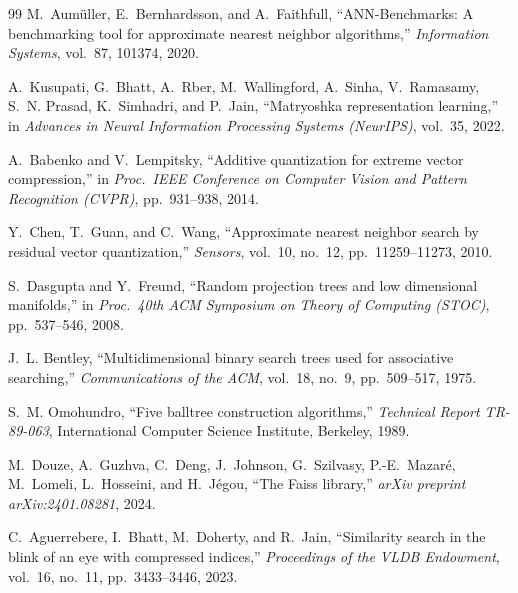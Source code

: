 \documentclass[11pt,a4paper]{article}
\theoremstyle{definition}
\begin{document}
\begin{thebibliography}{99}
M.~Aum\"uller, E.~Bernhardsson, and A.~Faithfull,
``ANN-Benchmarks: A benchmarking tool for approximate nearest neighbor algorithms,''
\emph{Information Systems}, vol.~87, 101374, 2020.

A.~Kusupati, G.~Bhatt, A.~Rber, M.~Wallingford, A.~Sinha,
V.~Ramasamy, S.~N. Prasad, K.~Simhadri, and P.~Jain,
``Matryoshka representation learning,''
in \emph{Advances in Neural Information Processing Systems (NeurIPS)},
vol.~35, 2022.

A.~Babenko and V.~Lempitsky,
``Additive quantization for extreme vector compression,''
in \emph{Proc.\ IEEE Conference on Computer Vision and Pattern Recognition
(CVPR)}, pp.~931--938, 2014.

Y.~Chen, T.~Guan, and C.~Wang,
``Approximate nearest neighbor search by residual vector quantization,''
\emph{Sensors}, vol.~10, no.~12, pp.~11259--11273, 2010.

S.~Dasgupta and Y.~Freund,
``Random projection trees and low dimensional manifolds,''
in \emph{Proc.\ 40th ACM Symposium on Theory of Computing (STOC)},
pp.~537--546, 2008.

J.~L. Bentley,
``Multidimensional binary search trees used for associative searching,''
\emph{Communications of the ACM}, vol.~18, no.~9, pp.~509--517, 1975.

S.~M. Omohundro,
``Five balltree construction algorithms,''
\emph{Technical Report TR-89-063}, International Computer Science
Institute, Berkeley, 1989.

M.~Douze, A.~Guzhva, C.~Deng, J.~Johnson, G.~Szilvasy, P.-E.~Mazar\'e,
M.~Lomeli, L.~Hosseini, and H.~J\'egou,
``The Faiss library,''
\emph{arXiv preprint arXiv:2401.08281}, 2024.

C.~Aguerrebere, I.~Bhatt, M.~Doherty, and R.~Jain,
``Similarity search in the blink of an eye with compressed indices,''
\emph{Proceedings of the VLDB Endowment}, vol.~16, no.~11, pp.~3433--3446,
2023.

\end{thebibliography}
\end{document}
